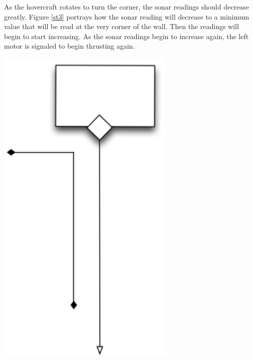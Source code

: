 As the hovercraft rotates to turn the corner, the sonar readings should decrease greatly. Figure \ref{st3} portrays how the sonar reading will decrease to a minimum value that will be read at the very corner of the wall. Then the readings will begin to start increasing. As the sonar readings begin to increase again, the left motor is signaled to begin thrusting again.

\begin{center}
 \includegraphics[width=85mm]{imageSources/sonarturn4.png}
\end{center}
\label{st4}


